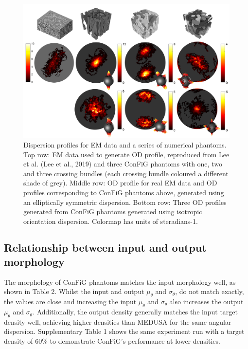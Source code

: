 \begin{figure}
  \centering
  \includegraphics[width=\textwidth]{figures/config/OD_ESAG_wcolorbar_wiso_sym_whitebg.png}
  \caption[Orientation distributions from real WM and ConFiG phantoms]{Dispersion profiles for EM data and a series of numerical phantoms. Top row: EM data used to generate OD profile, reproduced from Lee et al. (Lee et al., 2019) and three ConFiG phantoms with one, two and three crossing bundles (each crossing bundle coloured a different shade of grey). Middle row: OD profile for real EM data and OD profiles corresponding to ConFiG phantoms above, generated using an elliptically symmetric dispersion. Bottom row: Three OD profiles generated from ConFiG phantoms generated using isotropic orientation dispersion. Colormap has units of steradians-1. }
  \label{fig:config_res_OD}
\end{figure}

\subsection{Relationship between input and output morphology}
\label{sec:config_result_input_output_rel}
The morphology of ConFiG phantoms matches the input morphology well, as shown in Table 2. Whilst the input and output $\mu_\theta$ and $\sigma_\theta$, do not match exactly, the values are close and increasing the input $\mu_\theta$ and $\sigma_\theta$ also increases the output $\mu_\theta$ and $\sigma_\theta$. Additionally, the output density generally matches the input target density well, achieving higher densities than MEDUSA for the same angular dispersion. Supplementary Table 1 shows the same experiment run with a target density of 60\% to demonstrate ConFiG’s performance at lower densities.

